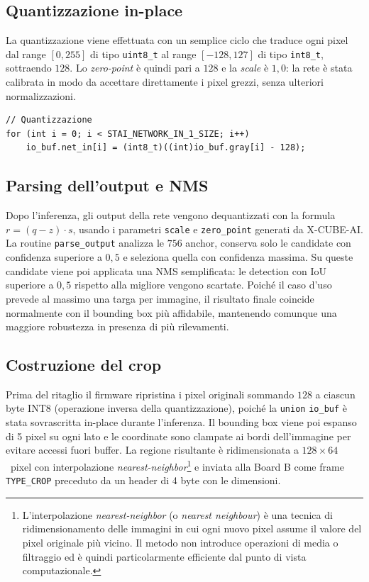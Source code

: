 \subsection{Quantizzazione in-place}
\label{sec:quant-A}

La quantizzazione viene effettuata con un semplice ciclo che traduce ogni pixel dal range $[0, 255]$ di tipo \texttt{uint8\_t} al range $[-128, 127]$ di tipo \texttt{int8\_t}, sottraendo $128$. Lo \textit{zero-point} è quindi pari a $128$ e la \textit{scale} è $1{,}0$: la rete è stata calibrata in modo da accettare direttamente i pixel grezzi, senza ulteriori normalizzazioni.

\begin{lstlisting}[style=stileC, caption={Quantizzazione.}, label={lst:quantization}]
// Quantizzazione
for (int i = 0; i < STAI_NETWORK_IN_1_SIZE; i++)
    io_buf.net_in[i] = (int8_t)((int)io_buf.gray[i] - 128);
\end{lstlisting}

\subsection{Parsing dell'output e NMS}
\label{sec:nms-A}

Dopo l'inferenza, gli output della rete vengono dequantizzati con la formula $r = (q - z) \cdot s$, usando i parametri \texttt{scale} e \texttt{zero\_point} generati da X-CUBE-AI. La routine \texttt{parse\_output} analizza le $756$ anchor, conserva solo le candidate con confidenza superiore a $0{,}5$ e seleziona quella con confidenza massima. Su queste candidate viene poi applicata una NMS semplificata: le detection con IoU superiore a $0{,}5$ rispetto alla migliore vengono scartate. Poiché il caso d'uso prevede al massimo una targa per immagine, il risultato finale coincide normalmente con il bounding box più affidabile, mantenendo comunque una maggiore robustezza in presenza di più rilevamenti.

\subsection{Costruzione del crop}
\label{sec:crop}

Prima del ritaglio il firmware ripristina i pixel originali sommando $128$ a
ciascun byte INT8 (operazione inversa della quantizzazione), poiché la
\texttt{union} \texttt{io\_buf} è stata sovrascritta in-place durante
l'inferenza. Il bounding box viene poi espanso di 5 pixel su ogni lato e
le coordinate sono clampate ai bordi dell'immagine per evitare accessi
fuori buffer. La regione risultante è ridimensionata a $128\times64$~pixel
con interpolazione \textit{nearest-neighbor}\footnote{L'interpolazione \textit{nearest-neighbor} (o \textit{nearest neighbour}) è una tecnica di ridimensionamento delle immagini in cui ogni nuovo pixel assume il valore del pixel originale più vicino. Il metodo non introduce operazioni di media o filtraggio ed è quindi particolarmente efficiente dal punto di vista computazionale.} e inviata alla Board B come frame
\texttt{TYPE\_CROP} preceduto da un header di 4 byte con le dimensioni.


